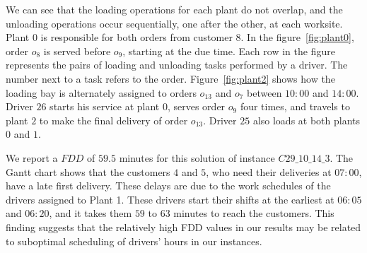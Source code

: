 \documentclass{article}
\begin{document}
We can see that the loading operations for each plant do not overlap, and the unloading operations occur sequentially, one after the other, at each worksite. Plant $0$ is responsible for both orders from customer $8$. In the figure~\ref*{fig:plant0}, order $o_8$ is served before $o_9$, starting at the due time. Each row in the figure represents the pairs of loading and unloading tasks performed by a driver. The number next to a task refers to the order.  Figure~\ref*{fig:plant2} shows how the loading bay is alternately assigned to orders $o_{13}$ and $o_7$ between $10:00$ and $14:00$. Driver $26$ starts his service at plant $0$, serves order $o_9$ four times, and travels to plant $2$ to make the final delivery of order $o_{13}$. Driver $25$ also loads at both plants $0$ and $1$.

We report a $FDD$ of $59.5$ minutes for this solution of instance $C29\_10\_14\_3$. The Gantt chart shows that the customers $4$ and $5$, who need their deliveries at $07:00$, have a late first delivery. These delays are due to the work schedules of the drivers assigned to Plant 1. These drivers start their shifts at the earliest at $06:05$ and $06:20$, and it takes them $59$ to $63$ minutes to reach the customers. This finding suggests that the relatively high FDD values in our results may be related to suboptimal scheduling of drivers' hours in our instances.
\end{document}
